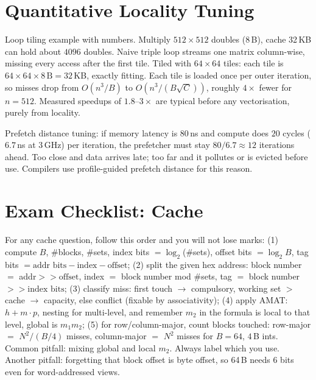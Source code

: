 \section{Quantitative Locality Tuning}
Loop tiling example with numbers. Multiply $512\times512$ doubles (8\,B), cache 32\,KB can hold about $4096$ doubles. Naive triple loop streams one matrix column-wise, missing every access after the first tile. Tiled with $64\times64$ tiles: each tile is $64\times64\times8\,\text{B}=32$\,KB, exactly fitting. Each tile is loaded once per outer iteration, so misses drop from $O(n^3/B)$ to $O(n^3/(B\sqrt{C}))$, roughly $4\times$ fewer for $n=512$. Measured speedups of $1.8$--$3\times$ are typical before any vectorisation, purely from locality.

Prefetch distance tuning: if memory latency is $80$\,ns and compute does $20$ cycles ($6.7$\,ns at 3\,GHz) per iteration, the prefetcher must stay $80/6.7\approx12$ iterations ahead. Too close and data arrives late; too far and it pollutes or is evicted before use. Compilers use profile-guided prefetch distance for this reason.
\section{Exam Checklist: Cache}
For any cache question, follow this order and you will not lose marks:
(1) compute $B$, \#blocks, \#sets, index bits $=\log_2$(\#sets), offset bits $=\log_2 B$, tag bits $= \text{addr bits} - \text{index} - \text{offset}$;
(2) split the given hex address: block number $=$ addr$>>\text{offset}$, index $=$ block number mod \#sets, tag $=$ block number $>>\text{index bits}$;
(3) classify miss: first touch $\to$ compulsory, working set $>$ cache $\to$ capacity, else conflict (fixable by associativity);
(4) apply AMAT: $h + m\cdot p$, nesting for multi-level, and remember $m_2$ in the formula is local to that level, global is $m_1m_2$;
(5) for row/column-major, count blocks touched: row-major $=$ $N^2 / (B/4)$ misses, column-major $=$ $N^2$ misses for $B=64$, $4$\,B ints.
Common pitfall: mixing global and local $m_2$. Always label which you use. Another pitfall: forgetting that block offset is byte offset, so 64\,B needs 6 bits even for word-addressed views.

